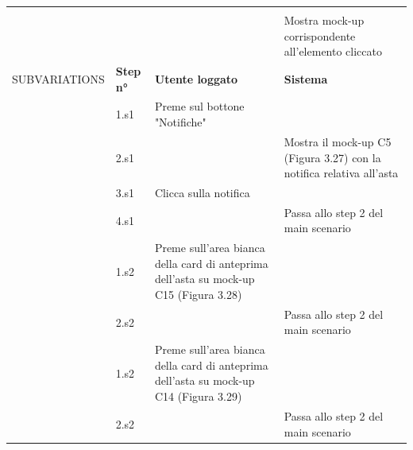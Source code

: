 \begin{longtable}{|C{3.0cm}|C{1.3cm}|L{5.2cm}|L{5.2cm}|}
                        & \\
                        & 
                        & 
                        & Mostra mock-up corrispondente all'elemento cliccato\\
                \hline
                    SUBVARIATIONS
                    & \textbf{Step n°} 
                    & \textbf{Utente loggato}
                    & \textbf{Sistema}\\
                \hline
                        & 1.s1
                        & Preme sul bottone "Notifiche"
                        & \\
                        & 2.s1
                        & 
                        & Mostra il mock-up C5 (Figura 3.27) con la notifica relativa all'asta\\
                        & 3.s1
                        & Clicca sulla notifica
                        & \\
                        & 4.s1
                        &
                        & Passa allo step 2 del main scenario\\
                \hline
                            & 1.s2
                            & Preme sull'area bianca della card di anteprima dell'asta su mock-up C15 (Figura 3.28)
                            & \\
                            & 2.s2
                            & 
                            & Passa allo step 2 del main scenario\\
                \hline
                            & 1.s2
                            & Preme sull'area bianca della card di anteprima dell'asta su mock-up C14 (Figura 3.29)
                            & \\
                            & 2.s2
                            & 
                            & Passa allo step 2 del main scenario\\
                \hline
            \end{longtable}

